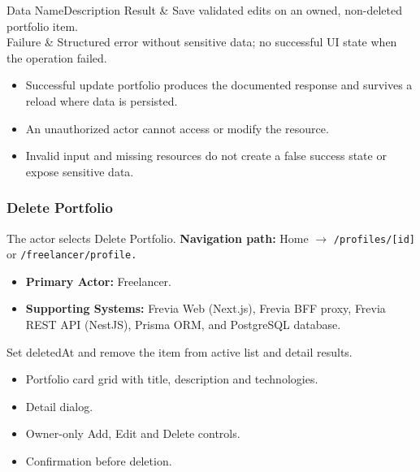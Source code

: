 \begin{specdatatable}{Data Name}{Description}
Result & Save validated edits on an owned, non-deleted portfolio item.\\ \hline
Failure & Structured error without sensitive data; no successful UI state when the operation failed.\\ \hline
\end{specdatatable}

\begin{itemize}[leftmargin=1.6em,topsep=3pt,itemsep=2pt,parsep=0pt,label=$\bullet$]
    \item Successful update portfolio produces the documented response and survives a reload where data is persisted.
    \item An unauthorized actor cannot access or modify the resource.
    \item Invalid input and missing resources do not create a false success state or expose sensitive data.
\end{itemize}

\subsubsection{Delete Portfolio}

The actor selects Delete Portfolio.\newline
\textbf{Navigation path:} Home $\rightarrow$ \texttt{/\allowbreak{}profiles/\allowbreak{}[id]} or \texttt{/\allowbreak{}freelancer/\allowbreak{}profile.}


\begin{itemize}[leftmargin=1.6em,topsep=3pt,itemsep=2pt,parsep=0pt,label=$\bullet$]
    \item \textbf{Primary Actor:} Freelancer.
    \item \textbf{Supporting Systems:} Frevia Web (Next.js), Frevia BFF proxy, Frevia REST API (NestJS), Prisma ORM, and PostgreSQL database.
\end{itemize}

\noindent Set deletedAt and remove the item from active list and detail results.

\begin{itemize}[leftmargin=1.6em,topsep=3pt,itemsep=2pt,parsep=0pt,label=$\bullet$]
    \item Portfolio card grid with title, description and technologies.
    \item Detail dialog.
    \item Owner-only Add, Edit and Delete controls.
    \item Confirmation before deletion.
\end{itemize}

